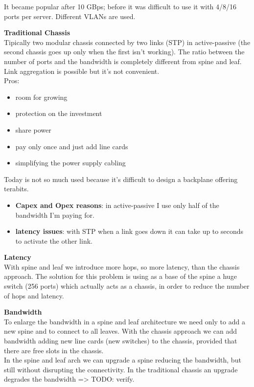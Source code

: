 It became popular after 10 GBps; before it was difficult to use it with
4/8/16 ports per server. Different VLANs are used.

\textbf{Traditional Chassis}\\
Tipically two modular chassis connected by two links (STP) in
active-passive (the second chassis goes up only when the first isn't
working). The ratio between the number of ports and the bandwidth is
completely different from spine and leaf. Link aggregation is possible
but it's not convenient.\\
Pros:

\begin{itemize}
\item
  room for growing
\item
  protection on the investment
\item
  share power
\item
  pay only once and just add line cards
\item
  simplifying the power supply cabling
\end{itemize}

Today is not so much used because it's difficult to design a backplane
offering terabits.

\begin{itemize}
\item
  \textbf{Capex and Opex reasons}: in active-passive I use only half of
  the bandwidth I'm paying for.
\item
  \textbf{latency issues}: with STP when a link goes down it can take up
  to seconds to activate the other link.
\end{itemize}

\textbf{Latency}\\
With spine and leaf we introduce more hops, so more latency, than the
chassis approach. The solution for this problem is using as a base of
the spine a huge switch (256 ports) which actually acts as a chassis, in
order to reduce the number of hops and latency.

\textbf{Bandwidth}\\
To enlarge the bandwidth in a spine and leaf architecture we need only
to add a new spine and to connect to all leaves. With the chassis
approach we can add bandwidth adding new line cards (new switches) to
the chassis, provided that there are free slots in the chassis.\\
In the spine and leaf arch we can upgrade a spine reducing the
bandwidth, but still without disrupting the connectivity. In the
traditional chassis an upgrade degrades the bandwidth =\textgreater{}
TODO: verify.

